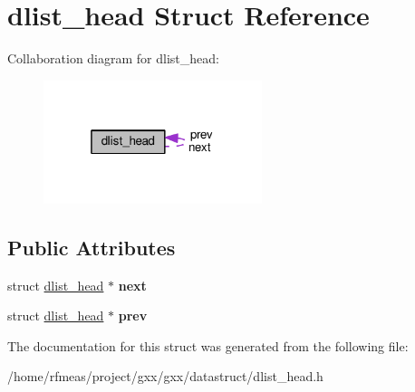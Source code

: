 \hypertarget{structdlist__head}{}\section{dlist\+\_\+head Struct Reference}
\label{structdlist__head}


Collaboration diagram for dlist\+\_\+head\+:
\nopagebreak
\begin{figure}[H]
\begin{center}
\leavevmode
\includegraphics[width=181pt]{structdlist__head__coll__graph}
\end{center}
\end{figure}
\subsection*{Public Attributes}
\begin{DoxyCompactItemize}
\item 
struct \hyperlink{structdlist__head}{dlist\+\_\+head} $\ast$ {\bfseries next}\hypertarget{structdlist__head_a7d3c90f5d2c2e11b893b01a9e54c9a6e}{}\label{structdlist__head_a7d3c90f5d2c2e11b893b01a9e54c9a6e}

\item 
struct \hyperlink{structdlist__head}{dlist\+\_\+head} $\ast$ {\bfseries prev}\hypertarget{structdlist__head_a7db0715aa084cbedeaf2fa67c9848d35}{}\label{structdlist__head_a7db0715aa084cbedeaf2fa67c9848d35}

\end{DoxyCompactItemize}


The documentation for this struct was generated from the following file\+:\begin{DoxyCompactItemize}
\item 
/home/rfmeas/project/gxx/gxx/datastruct/dlist\+\_\+head.\+h\end{DoxyCompactItemize}
